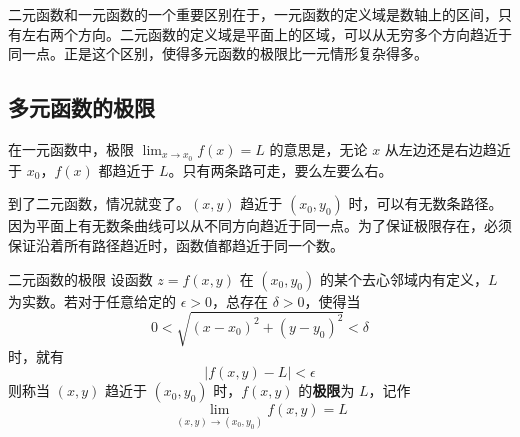 \begin{center}
\end{center}

二元函数和一元函数的一个重要区别在于，一元函数的定义域是数轴上的区间，只有左右两个方向。二元函数的定义域是平面上的区域，可以从无穷多个方向趋近于同一点。正是这个区别，使得多元函数的极限比一元情形复杂得多。


\subsection{多元函数的极限}

在一元函数中，极限 $\lim_{x \to x_0} f(x) = L$ 的意思是，无论 $x$ 从左边还是右边趋近于 $x_0$，$f(x)$ 都趋近于 $L$。只有两条路可走，要么左要么右。

到了二元函数，情况就变了。$(x,y)$ 趋近于 $(x_0, y_0)$ 时，可以有无数条路径。因为平面上有无数条曲线可以从不同方向趋近于同一点。为了保证极限存在，必须保证沿着所有路径趋近时，函数值都趋近于同一个数。

\begin{definition}{二元函数的极限}{}
设函数 $z = f(x, y)$ 在 $(x_0, y_0)$ 的某个去心邻域内有定义，$L$ 为实数。若对于任意给定的 $\epsilon > 0$，总存在 $\delta > 0$，使得当
\[
0 < \sqrt{(x - x_0)^2 + (y - y_0)^2} < \delta
\]
时，就有
\[
|f(x, y) - L| < \epsilon
\]
则称当 $(x, y)$ 趋近于 $(x_0, y_0)$ 时，$f(x, y)$ 的\textbf{极限}为 $L$，记作
\[
\lim_{(x,y) \to (x_0, y_0)} f(x, y) = L
\]
\end{definition}

